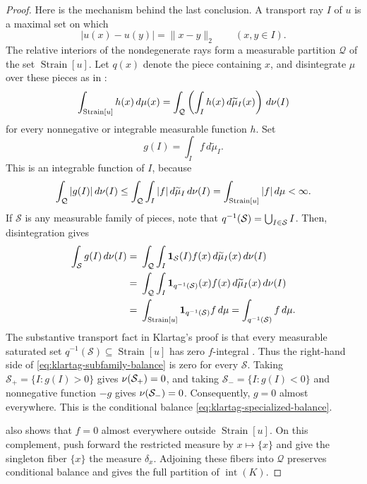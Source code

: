 \documentclass[11pt]{article}
\theoremstyle{definition}
\theoremstyle{remark}
\newcommand{\one}{\mathbf 1}
\begin{document}
\begin{proof}
Here is the mechanism behind the last conclusion.  A transport ray $I$ of $u$
is a maximal set on which
\[
 |u(x)-u(y)|=\|x-y\|_2\qquad(x,y\in I).
\]
The relative interiors of the nondegenerate rays form a measurable
partition $\mathcal{Q}$ of the set $\operatorname{Strain}[u]$.  Let $q(x)$ denote the
piece containing $x$, and disintegrate $\mu$ over these pieces as in
\cite[Theorem~1.4]{KlartagNeedles}:
\begin{align*}
    \int_{\operatorname{Strain}[u]} h(x)\,d\mu(x)=\int_{\cal Q} \left(\int_{I} h(x)\,d\widetilde{\mu}_I(x)\right)\,d\nu(I)
\end{align*}
for every nonnegative or integrable measurable function $h$. Set
\[
 g(I)=\int_I f\,d\widetilde\mu_I.
\]
This is an integrable function of $I$, because
\[
 \int_{\cal Q} |g(I)|\,d\nu(I)
 \le \int_{\cal Q} \int_I |f|\,d\widetilde\mu_I\,d\nu(I)
 =\int_{\operatorname{Strain}[u]}|f|\,d\mu<\infty.
\]
If $\mathcal S$ is any measurable family of pieces, note that $q^{-1}({\cal S})=\bigcup_{I\in {\cal S}}I$. Then, disintegration gives
\begin{equation}\label{eq:klartag-subfamily-balance}
\begin{aligned}
 \int_{\mathcal S}g(I)\,d\nu(I) =&~  \int_{\cal Q}\int_{I}\one_{\cal S}(I)f(x)\,d\widetilde{\mu}_I(x)\,d\nu(I)\\
 =&~ \int_{\cal Q}\int_{I}\one_{q^{-1}(\cal S)}(x)f(x)\,d\widetilde{\mu}_I(x)\,d\nu(I)\\
 = &~ \int_{\operatorname{Strain}[u]}\one_{q^{-1}(\cal S)}f\,d\mu
 = \int_{q^{-1}(\mathcal S)}f\,d\mu.
\end{aligned}
\end{equation}
The substantive transport fact in Klartag's proof is that every measurable
saturated set $q^{-1}(\mathcal S)\subseteq\operatorname{Strain}[u]$ has
zero $f$-integral
\cite[Lemma~4.6 and the proof of Theorem~1.5~\textup{(B)},
pp.~58--59]{KlartagNeedles}.  Thus the right-hand side of
\eqref{eq:klartag-subfamily-balance} is zero for every $\mathcal S$.
Taking $\mathcal{S}_+=\{I:g(I)>0\}$ gives $\nu({\cal S}_+)=0$, and taking
$\mathcal{S}_-=\{I:g(I)<0\}$ and nonnegative function $-g$ gives $\nu({\cal S}_-)=0$. Consequently, $g=0$ almost everywhere.  This is the
conditional balance \eqref{eq:klartag-specialized-balance}.  

\cite[Theorem~1.5~\textup{(B)}]{KlartagNeedles} also shows that $f=0$ almost everywhere outside $\operatorname{Strain}[u]$.  On this complement, push forward the restricted
measure by $x\mapsto\{x\}$ and give the singleton fiber $\{x\}$ the measure
$\delta_x$.  Adjoining these fibers into $\mathcal{Q}$ preserves conditional balance and gives the full partition of $\operatorname{int}(K)$.


\end{proof}
\end{document}
